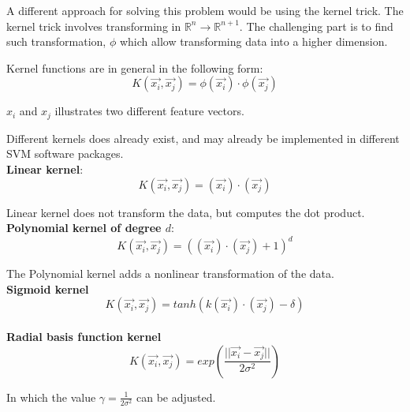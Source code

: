A different approach for solving this problem would be using the kernel trick. 
The kernel trick involves transforming in $\mathbb{R}^n \rightarrow 
\mathbb{R}^{n+1}$. 
The challenging part is to find such transformation, $\phi$ which allow 
transforming data into a higher dimension. 

Kernel functions are in general in the following form:
\begin{equation}
K(\overrightarrow{x_i},\overrightarrow{x_j}) = \phi(\overrightarrow{x_i}) \cdot 
\phi(\overrightarrow{x_j}) 
\end{equation}

$x_i$ and $x_j$ illustrates two different feature vectors. 

Different kernels does already exist, and may already be implemented in 
different SVM software packages. 
\\

\textbf{Linear kernel}:
\begin{equation}
K(\overrightarrow{x_i},\overrightarrow{x_j}) = (\overrightarrow{x_i}) \cdot 
(\overrightarrow{x_j}) 
\end{equation}

Linear kernel does not transform the data, but computes the dot product. 
\\

\textbf{Polynomial kernel of degree $d$}:
\begin{equation}
K(\overrightarrow{x_i},\overrightarrow{x_j}) = ((\overrightarrow{x_i}) \cdot 
(\overrightarrow{x_j})+1)^d
\end{equation}

The Polynomial kernel adds a nonlinear transformation of the data.
\\

\textbf{Sigmoid kernel}
\begin{equation}
K(\overrightarrow{x_i},\overrightarrow{x_j}) = tanh( k(\overrightarrow{x_i}) 
\cdot (\overrightarrow{x_j}) - \delta)
\end{equation}
\\

\textbf{Radial basis function kernel}
\begin{equation}
K(\overrightarrow{x_i},\overrightarrow{x_j}) =  
exp\left(\frac{||\overrightarrow{x_i} - 
\overrightarrow{x_j}||}{2\sigma^2}\right)
\end{equation}

In which the value $\gamma = \frac{1}{2\sigma^2}$ can be adjusted.\\


